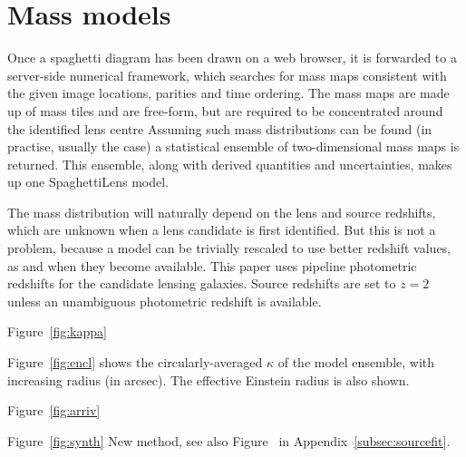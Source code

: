 \section{Mass models}\label{sec:massmodels}

Once a spaghetti diagram has been drawn on a web browser, it is
forwarded to a server-side numerical framework, which searches for
mass maps consistent with the given image locations, parities and time
ordering.  The mass maps are made up of mass tiles and are free-form,
but are required to be concentrated around the identified lens centre
\citep[see][for the precise formulation of the search
  problem.]{2014MNRAS.445.2181C} Assuming such mass distributions can
be found (in practise, usually the case) a statistical ensemble of
two-dimensional mass maps is returned.  This ensemble, along with
derived quantities and uncertainties, makes up one SpaghettiLens
model.

The mass distribution will naturally depend on the lens and source
redshifts, which are unknown when a lens candidate is first
identified.  But this is not a problem, because a model can be
trivially rescaled to use better redshift values, as and when they
become available.  This paper uses pipeline photometric redshifts for
the candidate lensing galaxies.  Source redshifts are set to $z=2$
unless an unambiguous photometric redshift is available.

Figure~\ref{fig:kappa}

Figure~\ref{fig:encl} shows the circularly-averaged $\kappa$ of the
model ensemble, with increasing radius (in arcsec).  The effective
Einstein radius \ER is also shown.

Figure~\ref{fig:arriv}

Figure~\ref{fig:synth}
New method, see also Figure~ in
Appendix~\ref{subsec:sourcefit}.

\endinput



  The ensemble average
can, however, be a useful representative of the whole ensemble.  The
user interface of SpaghettiLens returns graphical representations of
the ensemble-average mass map and some derived quantities to the
modeller for review.  The modeller can post these results on a forum,
or discard them and try again.  Other volunteers can start the
modelling process afresh, or they can take an existing model from the
forum and modify its input spaghetti diagram or its accompanying
options, and thus obtain a revised model.



